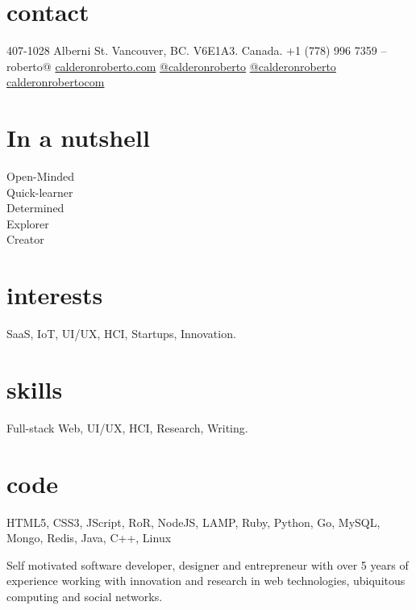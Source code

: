 \documentclass[full]{rvca}
\begin{document}


\begin{aside} %
\section{contact}
407-1028 Alberni St.
Vancouver, BC.
V6E1A3. Canada.
+1 (778) 996 7359
--
roberto@
\href{http://calderonroberto.com}{calderonroberto.com}
\emph{ } %
\TwitterIcon  \href{http://twitter.com/calderonroberto}{@calderonroberto} 
\GithubIcon \href{https://github.com/calderonroberto}{@calderonroberto} 
\LinkedinIcon \href{https://ca.linkedin.com/in/calderonrobertocom}{calderonrobertocom} 
%
\QrCode
%
\section{In a nutshell}
Open-Minded\\Quick-learner\\Determined\\Explorer\\Creator 
% 
\section{interests}
SaaS, IoT, UI/UX, HCI, Startups, Innovation.
%
\section{skills}
Full-stack Web, UI/UX, 
HCI, Research, Writing.
% 
\section{code}
HTML5, CSS3, \HeartIcon JScript, 
\HeartIcon RoR, \HeartIcon NodeJS, LAMP,
\HeartIcon Ruby, Python, \HeartIcon Go,
MySQL, Mongo, Redis,
Java, C++, \HeartIcon Linux
\end{aside}


\begin{statement}
Self motivated software developer, designer and entrepreneur with over 5 years of experience working with innovation and research in web technologies, ubiquitous computing and social networks.
\end{statement}
\end{document}
